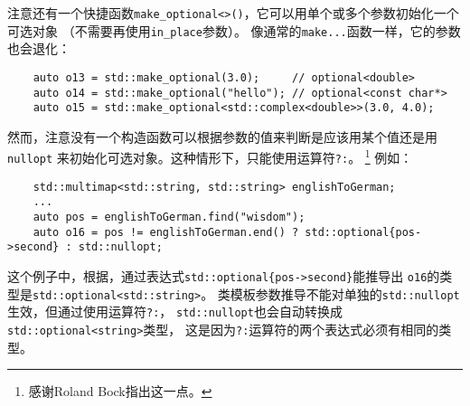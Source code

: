 注意还有一个快捷函数\texttt{make\_optional<>()}，它可以用单个或多个参数初始化一个可选对象
（不需要再使用\texttt{in\_place}参数）。
像通常的\texttt{make...}函数一样，它的参数也会退化：
\begin{lstlisting}
    auto o13 = std::make_optional(3.0);     // optional<double>
    auto o14 = std::make_optional("hello"); // optional<const char*>
    auto o15 = std::make_optional<std::complex<double>>(3.0, 4.0);
\end{lstlisting}
然而，注意没有一个构造函数可以根据参数的值来判断是应该用某个值还是用\texttt{nullopt}
来初始化可选对象。这种情形下，只能使用运算符\texttt{?:}。
\footnote{感谢Roland Bock指出这一点。}
例如：
\begin{lstlisting}
    std::multimap<std::string, std::string> englishToGerman;
    ...
    auto pos = englishToGerman.find("wisdom");
    auto o16 = pos != englishToGerman.end() ? std::optional{pos->second} : std::nullopt;
\end{lstlisting}
这个例子中，根据，通过表达式\texttt{std::optional\{pos->second\}}能推导出
\texttt{o16}的类型是\texttt{std::optional<std::string>}。
类模板参数推导不能对单独的\texttt{std::nullopt}生效，但通过使用运算符\texttt{?:}，
\texttt{std::nullopt}也会自动转换成\texttt{std::optional<string>}类型，
这是因为\texttt{?:}运算符的两个表达式必须有相同的类型。

